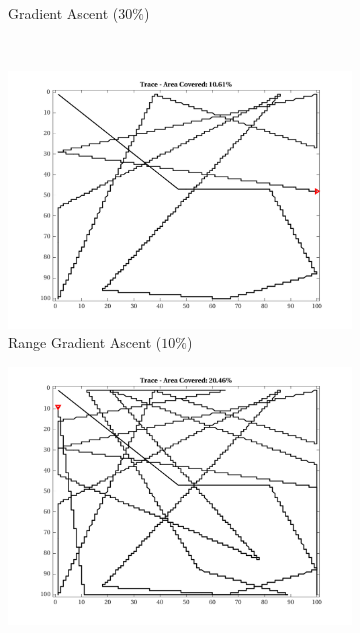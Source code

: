 \begin{figure}[htb!]
\begin{subfigure}[t]{0.32\textwidth}
        \ssp
        \captionsetup{skip=0.20\baselineskip,size=footnotesize}
        \caption{Gradient Ascent ($30\%$)}
    \end{subfigure}%
    \\
    \begin{subfigure}[t]{0.32\textwidth}
        \centering
        \includegraphics[width=\linewidth]{figures/hbresults/path_gr_10p_100x100_sf_50_seed_2.png}
        \ssp
        \captionsetup{skip=0.20\baselineskip,size=footnotesize}
        \caption{Range Gradient Ascent ($10\%$)}
    \end{subfigure}%
    \begin{subfigure}[t]{0.32\textwidth}
        \centering
        \includegraphics[width=\linewidth]{figures/hbresults/path_gr_20p_100x100_sf_50_seed_2.png}

\end{subfigure}
\end{figure}
